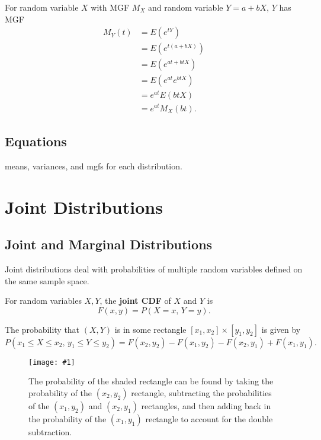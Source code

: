 \documentclass[a4paper,10pt]{article}
\newcommand{\fig}[1]{\centerline{\texttt{[image: \#1]}}}
\begin{document}
For random variable $X$ with MGF $M_X$ and random variable $Y=a+bX$, $Y$ has MGF 
\begin{align*}
    M_Y(t) &= E(e^{tY}) \\
           &= E(e^{t(a+bX)}) \\
           &= E(e^{at + btX}) \\
           &= E(e^{at}e^{btX}) \\
           &= e^{at}E(btX) \\
           &= e^{at}M_X(bt).
\end{align*}

\subsection{Equations}
means, variances, and mgfs for each distribution. 


\newpage
\section{Joint Distributions}

\subsection{Joint and Marginal Distributions}

Joint distributions deal with probabilities of multiple random variables defined on the same sample space.

For random variables $X, Y$, the \textbf{joint CDF} of $X$ and $Y$ is \begin{equation*}
    F(x, y) = P(X=x,\,Y=y).
\end{equation*}

The probability that $(X, Y)$ is in some rectangle $[x_1, x_2] \times [y_1, y_2]$ is given by 
\begin{equation*}
    P(x_1\leq X\leq x_2,\,y_1\leq Y\leq y_2) = F(x_2, y_2) - F(x_1, y_2) - F(x_2, y_1) + F(x_1, y_1).
\end{equation*}

\begin{figure}[!ht]
    \centering
    \fig{joint}
    \caption{The probability of the shaded rectangle can be found by taking the probability of the $(x_2, y_2)$ rectangle, subtracting the probabilities of the $(x_1, y_2)$ and $(x_2, y_1)$ rectangles, and then adding back in the probability of the $(x_1, y_1)$ rectangle to account for the double subtraction.}
\end{figure}
\end{document}
